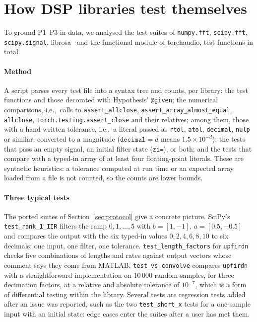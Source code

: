\documentclass[10pt,conference]{IEEEtran}
\newcommand{\code}[1]{\texttt{#1}}
\newcommand{\ie}{i.e.,\ }
\begin{document}
\section{How DSP libraries test themselves}
\label{sec:survey}

To ground P1--P3 in data, we analysed the test suites of \code{numpy.fft},
\code{scipy.fft}, \code{scipy.signal}, librosa~\cite{mcfee2015librosa} and the
functional module of torchaudio, \surveyTotalTests{} test functions in total.

\paragraph*{Method} A script parses every test file into a syntax tree and
counts, per library: the test functions and those decorated with Hypothesis'
\code{@given}; the numerical comparisons, \ie calls to \code{assert\_allclose},
\code{assert\_array\_almost\_equal}, \code{allclose},
\code{torch.testing.assert\_close} and their relatives; among them, those with a
hand-written tolerance, \ie a literal passed as \code{rtol}, \code{atol},
\code{decimal}, \code{nulp} or similar, converted to a magnitude
($\code{decimal}=d$ means $1.5\times10^{-d}$); the tests that pass an empty
signal, an initial filter state (\code{zi=}), or both; and the tests that compare
with a typed-in array of at least four floating-point literals. These are
syntactic heuristics: a tolerance computed at run time or an expected array
loaded from a file is not counted, so the counts are lower bounds.



\paragraph*{Three typical tests} The ported suites of Section~\ref{sec:protocol}
give a concrete picture. SciPy's \code{test\_rank\_1\_IIR} filters the ramp
$0,1,\dots,5$ with $b=[1,-1]$, $a=[0.5,-0.5]$ and compares the output with the six
typed-in values $0,2,4,6,8,10$ to six decimals: one input, one filter, one
tolerance. \code{test\_length\_factors} for \code{upfirdn} checks five
combinations of lengths and rates against output vectors whose comment says they
come from MATLAB. \code{test\_vs\_convolve} compares \code{upfirdn} with a
straightforward implementation on 10\,000 random samples, for three
decimation factors, at a relative and absolute tolerance of $10^{-7}$, which is a
form of differential testing within the library. Several tests are regression
tests added after an issue was reported, such as the two \code{test\_short\_x} tests for a
one-sample input with an initial state: edge cases enter the suites after a user
has met them.
\end{document}
